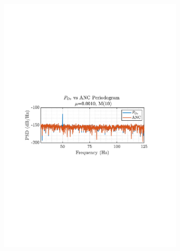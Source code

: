 \documentclass[12pt]{article}
\numberwithin{equation}{section}
\begin{document}
			\begin{figure}[H]
				\centering
				\begin{subfigure}{0.49\textwidth}
					\centering
					\includegraphics[trim={2.2cm 11.2cm 3.15cm  11.2cm}, clip, width=\textwidth]{../MATLAB/figures/q2_3d_fig02.pdf} 
					\captionsetup{justification=centering}
				\end{subfigure}
				\begin{subfigure}{0.49\textwidth}
					\centering

\end{subfigure}
\end{figure}
\end{document}
